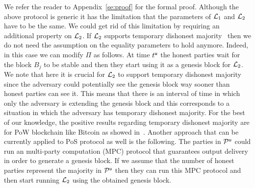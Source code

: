 We refer the reader to Appendix~\ref{se:proof} for the formal proof.
Although the above protocol is generic it has the limitation that the parameters
of $\mathcal{L}_1$ and $\mathcal{L}_2$ have to be the same. We could get rid of this limitation by requiring an additional property on $\mathcal{L}_2$.
If $\mathcal{L}_2$ supports temporary dishonest majority~\cite{DBLP:journals/corr/abs-1908-00427} then we do not need the assumption on the equality parameters to 
hold anymore.
Indeed, in this case we can modify $\Pi$ as follows. At time $t^{\mathsf{u}}$ the honest parties wait for the block $B_j$ to be stable and then they start using it as a genesis 
block for $\mathcal{L}_2$.  We note that here it is crucial for $\mathcal{L}_2$ to support temporary dishonest majority since the adversary
could potentially see the genesis block way sooner than honest parties can see it. This means that there is an interval of time in which only the adversary is extending 
the genesis block and this corresponds to a situation in which the adversary has temporary dishonest majority.
For the best of our knowledge, the positive results regarding temporary dishonest majority are for PoW blockchain like Bitcoin as showed in~\cite{DBLP:journals/corr/abs-1908-00427}.
Another approach that can be currently applied to PoS protocol as well is the following. The parties in $\mathcal{P}^\mathsf{u}$ could run an multi-party computation (MPC) protocol
that guarantees output delivery in order to generate a genesis block. If we assume that the number of honest parties represent the majority in $\mathcal{P}^\mathsf{u}$
then they can run this MPC protocol and then start running $\mathcal{L}_2$ using the obtained genesis block.







